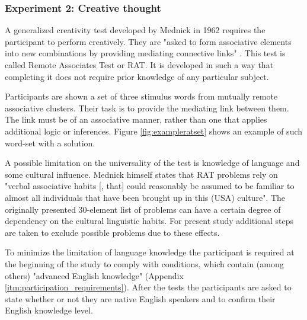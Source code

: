 		\subsubsection{Experiment 2: Creative thought} \label{sec:creativity}
		
		A generalized creativity test developed by Mednick \cite{Mednick1962} in 1962 requires the participant to perform creatively. They are "asked to form associative elements into new combinations by providing mediating connective links" \cite[p. 226]{Mednick1962}. This test is called Remote Associates Test or RAT.
		It is developed in such a way that completing it does not require prior knowledge of any particular subject. 
		
		Participants are shown a set of three stimulus words from mutually remote associative clusters. Their task is to provide the mediating link between them. The link must be of an associative manner, rather than one that applies additional logic or inferences. Figure \ref{fig:exampleratset} shows an example of such word-set with a solution.
		
		A possible limitation on the universality of the test is knowledge of language and some cultural influence. Mednick himself states that RAT problems rely on "verbal associative habits [, that] could reasonably be assumed to be familiar to almost all individuals that have been brought up in this (USA) culture". The originally presented 30-element list of problems can have a certain degree of dependency on the cultural linguistic habits. For present study additional steps are taken to exclude possible problems due to these effects. 
		
		To minimize the limitation of language knowledge the participant is required at the beginning of the study to comply with conditions, which contain (among others) "advanced English knowledge" (Appendix \ref{itm:participation_requirements}). After the tests the participants are asked to state whether or not they are native English speakers and to confirm their English knowledge level.
		
